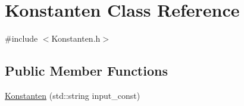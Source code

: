 \hypertarget{classKonstanten}{\section{Konstanten Class Reference}
\label{classKonstanten}
}


{\ttfamily \#include $<$Konstanten.\-h$>$}

\subsection*{Public Member Functions}
\begin{DoxyCompactItemize}
\item 
\hyperlink{classKonstanten_a4a5a2fac8680b4cf055029be43f4c18c}{Konstanten} (std\-::string input\-\_\-const)
\end{DoxyCompactItemize}
